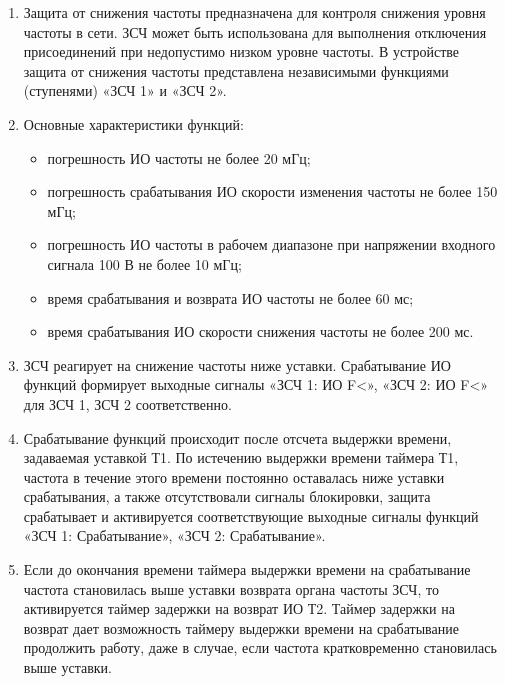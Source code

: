 
\color{black}

\begin{enumerate}

\item
Защита от снижения частоты предназначена для контроля снижения уровня частоты в сети. ЗСЧ может быть использована для выполнения отключения присоединений при недопустимо низком уровне частоты. В устройстве защита от снижения частоты представлена независимыми функциями (ступенями) «ЗСЧ 1» и «ЗСЧ 2».

\item
Основные характеристики функций:
\begin{itemize}
    \item погрешность ИО частоты не более 20 мГц;
    \item погрешность срабатывания ИО скорости изменения частоты не более 150 мГц;
    \item погрешность ИО частоты в рабочем диапазоне при напряжении входного сигнала 100 В не более 10 мГц; 
    \item время срабатывания и возврата ИО частоты не более 60 мс;
    \item время срабатывания ИО скорости снижения частоты не более 200 мс.
\end{itemize}

\item
ЗСЧ реагирует на снижение частоты ниже уставки. Срабатывание ИО функций формирует выходные сигналы «ЗСЧ 1: ИО F<», «ЗСЧ 2: ИО F<» для ЗСЧ 1, ЗСЧ 2 соответственно.

\item
Срабатывание функций происходит после отсчета выдержки времени, задаваемая уставкой Т1. По истечению выдержки времени таймера Т1, частота в течение этого времени постоянно оставалась ниже уставки срабатывания, а также отсутствовали сигналы блокировки, защита срабатывает и активируется соответствующие выходные сигналы функций «ЗСЧ 1: Срабатывание», «ЗСЧ 2: Срабатывание».

\item
Если до окончания времени таймера выдержки времени на срабатывание частота становилась выше уставки возврата органа частоты ЗСЧ, то активируется таймер задержки на возврат ИО Т2. Таймер задержки на возврат дает возможность таймеру выдержки времени на срабатывание продолжить работу, даже в случае, если частота кратковременно становилась выше уставки.


\end{enumerate}
